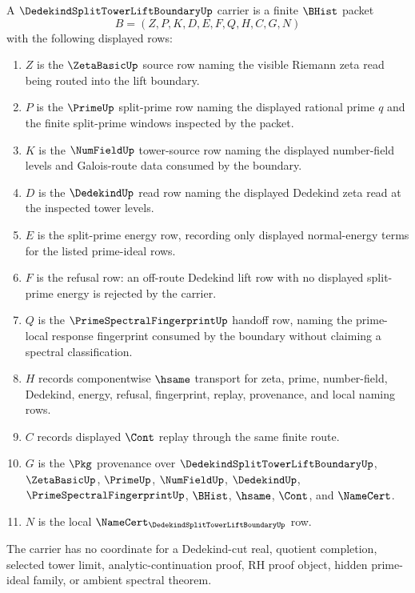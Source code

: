 \begin{definition}
\label{def:dedekind-split-tower-lift-boundary-carrier}
A $\DedekindSplitTowerLiftBoundaryUp$ carrier is a finite $\BHist$ packet
$$
B=(Z,P,K,D,E,F,Q,H,C,G,N)
$$
with the following displayed rows:
\begin{enumerate}
\item $Z$ is the $\ZetaBasicUp$ source row naming the visible Riemann zeta read being routed into the lift boundary.
\item $P$ is the $\PrimeUp$ split-prime row naming the displayed rational prime $q$ and the finite split-prime windows inspected by the packet.
\item $K$ is the $\NumFieldUp$ tower-source row naming the displayed number-field levels and Galois-route data consumed by the boundary.
\item $D$ is the $\DedekindUp$ read row naming the displayed Dedekind zeta read at the inspected tower levels.
\item $E$ is the split-prime energy row, recording only displayed normal-energy terms for the listed prime-ideal rows.
\item $F$ is the refusal row: an off-route Dedekind lift row with no displayed split-prime energy is rejected by the carrier.
\item $Q$ is the $\PrimeSpectralFingerprintUp$ handoff row, naming the prime-local response fingerprint consumed by the boundary without claiming a spectral classification.
\item $H$ records componentwise $\hsame$ transport for zeta, prime, number-field, Dedekind, energy, refusal, fingerprint, replay, provenance, and local naming rows.
\item $C$ records displayed $\Cont$ replay through the same finite route.
\item $G$ is the $\Pkg$ provenance over $\DedekindSplitTowerLiftBoundaryUp$, $\ZetaBasicUp$, $\PrimeUp$, $\NumFieldUp$, $\DedekindUp$, $\PrimeSpectralFingerprintUp$, $\BHist$, $\hsame$, $\Cont$, and $\NameCert$.
\item $N$ is the local $\NameCert_{\DedekindSplitTowerLiftBoundaryUp}$ row.
\end{enumerate}
The carrier has no coordinate for a Dedekind-cut real, quotient completion, selected tower limit, analytic-continuation proof, RH proof object, hidden prime-ideal family, or ambient spectral theorem.
\end{definition}

